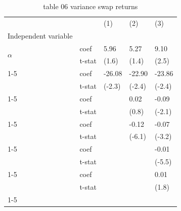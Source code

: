 \begin{table}[htbp]
  \centering
  \caption{table 06 variance swap returns}
  \label{tab:table_06_variance_swap_returns}
  \begin{tabular}{lllll}
\toprule
 &  & (1) & (2) & (3) \\
Independent variable &  &  &  &  \\
\midrule
\multirow[t]{2}{*}{$\alpha$} & coef & 5.96 & 5.27 & 9.10 \\
 & t-stat & (1.6) & (1.4) & (2.5) \\
\cline{1-5}
\multirow[t]{2}{*}{$I_{B\sigma^2}$} & coef & -26.08 & -22.90 & -23.86 \\
 & t-stat & (-2.3) & (-2.4) & (-2.4) \\
\cline{1-5}
\multirow[t]{2}{*}{$\tilde{r}^e_{m,t}$} & coef &  & 0.02 & -0.09 \\
 & t-stat &  & (0.8) & (-2.1) \\
\cline{1-5}
\multirow[t]{2}{*}{$I_{B\sigma^2} \cdot \tilde{r}^e_{m,t}$} & coef &  & -0.12 & -0.07 \\
 & t-stat &  & (-6.1) & (-3.2) \\
\cline{1-5}
\multirow[t]{2}{*}{$\tilde{r}_{vs,t}$} & coef &  &  & -0.01 \\
 & t-stat &  &  & (-5.5) \\
\cline{1-5}
\multirow[t]{2}{*}{$I_{B\sigma^2} \cdot \tilde{r}_{vs,t}$} & coef &  &  & 0.01 \\
 & t-stat &  &  & (1.8) \\
\cline{1-5}
\bottomrule
\end{tabular}

\end{table}
